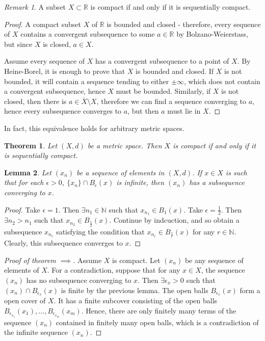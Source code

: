 \documentclass{article}
\theoremstyle{definition}
\theoremstyle{plain}%
\newtheorem{thm}{Theorem}[section]
\newtheorem{lem}[thm]{Lemma}
\theoremstyle{remark}
\newtheorem*{rem}{Remark}
\newcommand{\intersection}{\cap}
\newcommand{\R}{\mathbb{R}}
\begin{document}
\begin{rem}
    A subset $X \subset \R$ is compact if and only if it is sequentially compact.
\end{rem}

\begin{proof}
    A compact subset $X$ of $\R$ is bounded and closed - therefore, every sequence of $X$ contains a convergent subsequence to some $a \in \R$ by Bolzano-Weierstass, but since $X$ is closed, $a \in X$.
    
    Assume every sequence of $X$ has a convergent subsequence to a point of $X$. By Heine-Borel, it is enough to prove that $X$ is bounded and closed. If $X$ is not bounded, it will contain a sequence tending to either $\pm \infty$, which does not contain a convergent subsequence, hence $X$ must be bounded. Similarly, if $X$ is not closed, then there is $a \in \overline{X} \setminus X$, therefore we can find a sequence converging to $a$, hence every subsequence converges to $a$, but then $a$ must lie in $X$.
\end{proof}

In fact, this equivalence holds for arbitrary metric spaces.

\begin{thm}
    Let $(X,d)$ be a metric space. Then $X$ is compact if and only if it is sequentially compact.
\end{thm}

\begin{lem}
    Let $(x_n)$ be a sequence of elements in $(X,d)$. If $x \in X$ is such that for each $\epsilon > 0$, $\{x_n\} \intersection B_\epsilon(x)$ is infinite, then $(x_n)$ has a subsequence converging to $x$.
\end{lem}

\begin{proof}
    Take $\epsilon = 1$. Then $\exists n_1 \in \mathbb{N}$ such that $x_{n_1} \in B_1(x)$. Take $\epsilon = \frac{1}{2}$. Then $\exists n_2 > n_1$ such that $x_{n_2} \in B_{\frac{1}{2}}(x)$. Continue by indcuction, and so obtain a subsequence $x_{n_r}$ satisfying the condition that $x_{n_r} \in B_{\frac{1}{r}}(x)$ for any $r \in \mathbb{N}$. Clearly, this subsequence converges to $x$. 
\end{proof}

\begin{proof}[Proof of theorem $\implies$]
    Assume $X$ is compact. Let $(x_n)$ be any sequence of elements of $X$. For a contradiction, suppose that for any $x \in X$, the sequence $(x_n)$ has no subsequence converging to $x$. Then $\exists \epsilon_x  > 0$ such that $(x_n) \intersection B_{\epsilon_x}(x)$ is finite by the previous lemma. The open balls $B_{\epsilon_x}(x)$ form a open cover of $X$. It has a finite subcover consisting of the open balls $B_{\epsilon_{x_1}}(x_1), ..., B_{\epsilon_{x_m}}(x_m)$. Hence, there are only finitely many terms of the sequence $(x_n)$ contained in finitely many open balls, which is a contradiction of the infinite sequence $(x_n)$.
\end{proof}
\end{document}
